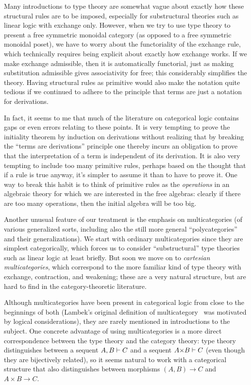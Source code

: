 Many introductions to type theory are somewhat vague about exactly how these structural rules are to be imposed, especially for substructural theories such as linear logic with exchange only.
However, when we try to use type theory to present a free symmetric monoidal category (as opposed to a free symmetric monoidal poset), we have to worry about the functoriality of the exchange rule, which technically requires being explicit about exactly how exchange works.
If we make exchange admissible, then it is automatically functorial, just as making substitution admissible gives associativity for free; this considerably simplifies the theory.
Having structural rules as primitive would also make the notation quite tedious if we continued to adhere to the principle that terms are just a notation for derivations.

In fact, it seems to me that much of the literature on categorical logic contains gaps or even errors relating to these points.
It is very tempting to prove the initiality theorem by induction on derivations without realizing that by breaking the ``terms are derivations'' principle one thereby incurs an obligation to prove that the interpretation of a term is independent of its derivation.
It is also very tempting to include too many primitive rules, perhaps based on the thought that if a rule is true anyway, it's simpler to assume it than to have to prove it.
One way to break this habit is to think of primitive rules as the \emph{operations} in an algebraic theory for which we are interested in the free algebras: clearly if there are too many operations, then the initial algebra will be too big.

Another unusual feature of our treatment is the emphasis on multicategories (of various generalized sorts, including also the still more general ``polycategories'' and their generalizations).
We start with ordinary multicategories since they are simplest categorically, which forces us to consider ``substructural'' type theories such as linear logic at least briefly.
But soon we move on to \emph{cartesian multicategories}, which correspond to the more familiar kind of type theory with exchange, contraction, and weakening; these are a very natural structure, but are hard to find in the category-theoretic literature.

Although multicategories have been present in categorical logic from close to the beginnings of both (Lambek's original definition of multicategory~\cite{lambek:dedsys-ii} was motivated by logical considerations), they are rarely mentioned in introductions to the subject.
One concrete advantage of using multicategories is a more direct correspondence between the type theory and the category theory: type theory distinguishes between a sequent $A,B\vdash C$ and a sequent $A\times B\types C$ (even though they are bijectively related), so it seems natural to work with a categorical structure that also distinguishes between morphisms $(A,B)\to C$ and $A\times B\to C$.

